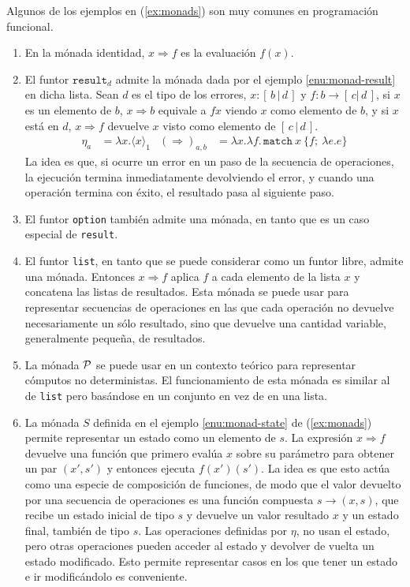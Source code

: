 \begin{example}
  Algunos de los ejemplos en (\ref{ex:monads}) son muy comunes en programación
  funcional.\cite[pp. 17--24]{haskmon}
  \begin{enumerate}
  \item En la mónada identidad, $x\Rightarrow f$ es la evaluación $f(x)$.
  \item El funtor $\mathtt{result}_d$ admite la mónada dada por el ejemplo
    \ref{enu:monad-result} en dicha lista. Sean $d$ es el tipo de los errores,
    $x:[\,b\,|\,d\,]$ y $f:b\to[\,c|\,d\,]$, si $x$ es un elemento de $b$,
    $x\Rightarrow b$ equivale a $fx$ viendo $x$ como elemento de $b$, y si $x$
    está en $d$, $x\Rightarrow f$ devuelve $x$ visto como elemento de
    $[\,c\,|\,d\,]$.
    \begin{align*}
      \eta_a & = \lambda x.\langle x\rangle_1
      & (\Rightarrow)_{a,b} & = \lambda x.\lambda f.\,\mathtt{match}\ x\ \{f;\ \lambda e.e\}
    \end{align*}
    La idea es que, si ocurre un error en un paso de la secuencia de
    operaciones, la ejecución termina inmediatamente devolviendo el error, y
    cuando una operación termina con éxito, el resultado pasa al siguiente paso.
  \item El funtor \texttt{option} también admite una mónada, en tanto que es un
    caso especial de \texttt{result}.
  \item El funtor \texttt{list}, en tanto que se puede considerar como un funtor
    libre, admite una mónada. Entonces $x\Rightarrow f$ aplica $f$ a cada
    elemento de la lista $x$ y concatena las listas de resultados. Esta mónada
    se puede usar para representar secuencias de operaciones en las que cada
    operación no devuelve necesariamente un sólo resultado, sino que devuelve
    una cantidad variable, generalmente pequeña, de resultados.
  \item La mónada $\mathcal{P}$ se puede usar en un contexto teórico para representar
    cómputos no deterministas. El funcionamiento de esta mónada es similar al de
    \texttt{list} pero basándose en un conjunto en vez de en una lista.
  \item La mónada $S$ definida en el ejemplo \ref{enu:monad-state} de
    (\ref{ex:monads}) permite representar un estado como un elemento de $s$. La
    expresión $x\Rightarrow f$ devuelve una función que primero evalúa $x$ sobre
    su parámetro para obtener un par $(x',s')$ y entonces ejecuta
    $f(x')(s')$. La idea es que esto actúa como una especie de composición de
    funciones, de modo que el valor devuelto por una secuencia de operaciones es
    una función compuesta $s\to(x,s)$, que recibe un estado inicial de tipo $s$
    y devuelve un valor resultado $x$ y un estado final, también de tipo
    $s$. Las operaciones definidas por $\eta$, no usan el estado, pero otras
    operaciones pueden acceder al estado y devolver de vuelta un estado
    modificado. Esto permite representar casos en los que tener un estado e ir
    modificándolo es conveniente.
  \end{enumerate}
\end{example}


